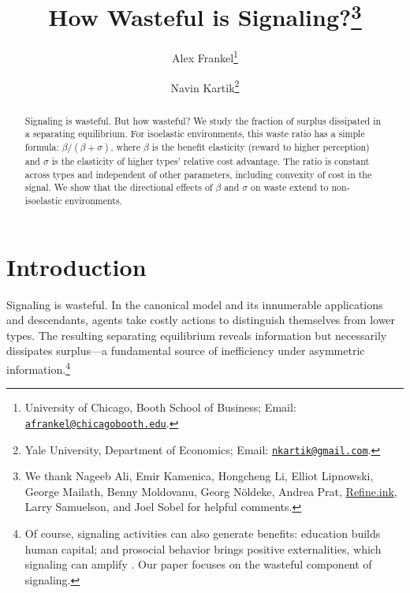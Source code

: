 \documentclass[12 pt]{article}
\theoremstyle{remark}
\theoremstyle{definition}
\newcommand{\mailto}[1]{\href{mailto:#1}{\texttt{#1}}} %
\let\oldfootnote\footnote
\renewcommand\footnote[1]{\oldfootnote{\hspace{.5mm}#1}}
\begin{document}
\title{How Wasteful is Signaling?\thanks{We thank Nageeb Ali, Emir Kamenica, Hongcheng Li, Elliot Lipnowski, George Mailath, Benny Moldovanu, Georg N{\"o}ldeke, Andrea Prat, \href{https://www.refine.ink}{Refine.ink}, Larry Samuelson, and Joel Sobel for helpful comments.}}

\author{Alex Frankel\thanks{University of Chicago, Booth School of Business; Email: \mailto{afrankel@chicagobooth.edu}.} \and Navin Kartik\thanks{Yale University, Department of Economics; Email: \mailto{nkartik@gmail.com}.}}
\maketitle
\thispagestyle{empty}

\begin{abstract}
\noindent
Signaling is wasteful. But how wasteful? We study the fraction of surplus dissipated in a separating equilibrium. For isoelastic environments, this waste ratio has a simple formula: $\beta/(\beta+\sigma)$, where $\beta$ is the benefit elasticity (reward to higher perception) and $\sigma$ is the elasticity of higher types' relative cost advantage. The ratio is constant across types and independent of other parameters, including convexity of cost in the signal. %
We show that the directional effects of $\beta$ and $\sigma$ on waste extend to non-isoelastic environments.
\end{abstract}

\newpage
\setcounter{page}{1}

\section{Introduction}
\label{sec:intro}


Signaling is wasteful. In the canonical \citet{Spence73} model and its innumerable applications and descendants, agents take costly actions to distinguish themselves from lower types. The resulting separating equilibrium reveals information but necessarily dissipates surplus---a fundamental source of inefficiency under asymmetric information.\footnote{\label{fn:productive}Of course, signaling activities can also generate benefits: education builds human capital; and prosocial behavior brings positive externalities, which signaling can amplify \citep{BT06}. Our paper  focuses on the wasteful component of signaling.} 
\end{document}

